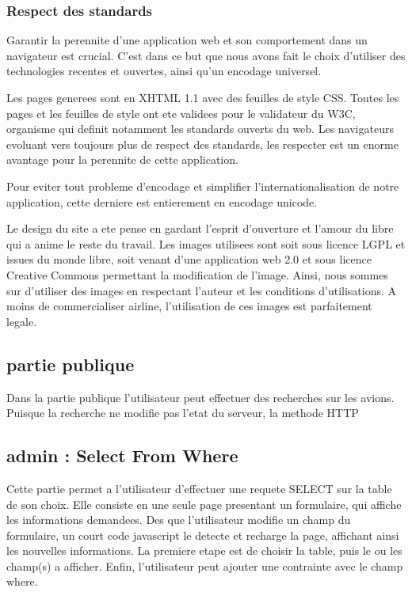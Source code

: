 \subsubsection{Respect des standards}
Garantir la perennite d'une application web et son comportement dans un navigateur est crucial. C'est dans ce but que nous avons fait le choix d'utiliser des technologies recentes et ouvertes, ainsi qu'un encodage universel.

Les pages generees sont en XHTML 1.1 avec des feuilles de style CSS. Toutes les pages et les feuilles de style ont ete validees pour le validateur du W3C, organisme qui definit notamment les standards ouverts du web. Les navigateurs evoluant vers toujours plus de respect des standards, les respecter est un enorme avantage pour la perennite de cette application.

Pour eviter tout probleme d'encodage et simplifier l'internationalisation de notre application, cette derniere est entierement en encodage unicode.

Le design du site a ete pense en gardant l'esprit d'ouverture et l'amour du libre qui a anime le reste du travail. Les images utilisees sont soit sous licence LGPL et issues du monde libre, soit venant d'une application web 2.0 et sous licence Creative Commons permettant la modification de l'image. Ainsi, nous sommes sur d'utiliser des images en respectant l'auteur et les conditions d'utilisations. A moins de commercialiser airline, l'utilisation de ces images est parfaitement legale.

\subsection{partie publique}
Dans la partie publique l'utilisateur peut effectuer des recherches sur les avions. Puisque la recherche ne modifie pas l'etat du serveur, la methode HTTP

\subsection{admin : Select From Where}
Cette partie permet a l'utilisateur d'effectuer une requete SELECT sur la table de son choix. Elle consiste en une seule page presentant un formulaire, qui affiche les informations demandees. Des que l'utilisateur modifie un champ du formulaire, un court code javascript le detecte et recharge la page, affichant ainsi les nouvelles informations. La premiere etape est de choisir la table, puis le ou les champ(s) a afficher. Enfin, l'utilisateur peut ajouter une contrainte avec le champ where.

